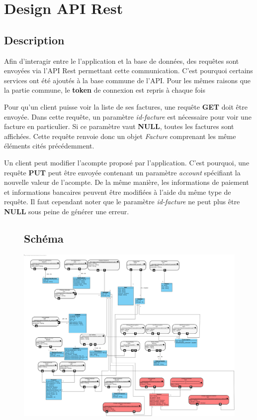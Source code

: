 \section{Design API Rest}
\subsection{Description}

\begin{flushleft}
Afin d'interagir entre le l'application et la base de données, des requêtes sont envoyées via l'API Rest permettant cette communication. C'est pourquoi certains services ont été ajoutés à la base commune de l'API.
Pour les mêmes raisons que la partie commune, le \textbf{token} de connexion est repris à chaque fois
\end{flushleft}

\begin{flushleft}
Pour qu'un client puisse voir la liste de ses factures, une requête \textbf{GET} doit être envoyée. Dans cette requête, un paramètre \emph{id-facture} est nécessaire pour voir une facture en particulier. Si ce paramètre vaut \textbf{NULL}, toutes les factures sont affichées.
Cette requête renvoie donc un objet \emph{Facture} comprenant les même éléments cités précédemment.
\end{flushleft}

\begin{flushleft}
Un client peut modifier l'acompte proposé par l'application. C'est pourquoi, une requête \textbf{PUT} peut être envoyée contenant un paramètre \emph{account} spécifiant la nouvelle valeur de l'acompte.
De la même manière, les informations de paiement et informations bancaires peuvent être modifiées à l'aide du même type de requête.
Il faut cependant noter que le paramètre \emph{id-facture} ne peut plus être \textbf{NULL} sous peine de générer une erreur.
\end{flushleft}

\newpage
\begin{figure}[h]
\subsection{Schéma}
\centering
\includegraphics[width = 1.2\textwidth]{extension-maxime/apirest/img/apirest-extension.png}
\end{figure}
